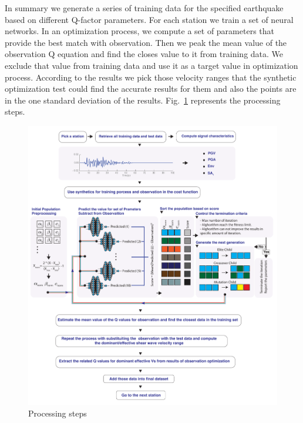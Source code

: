 
In summary we generate a series of training data for the specified earthquake based on different Q-factor parameters. For each station we train a set of neural networks. In an optimization process, we compute a set of parameters that provide the best match with observation. Then we peak the mean value of the observation Q equation and find the closes value to it from training data. We exclude that value from training data and use it as a target value in optimization process. According to the results we pick those velocity ranges that the synthetic optimization test could find the accurate results for them and also the points are in the one standard deviation of the results. Fig.~\ref{fig:Figure_1} represents the processing steps. 

 \begin{figure}
    \centering
    \includegraphics[width=\textwidth]{figures/pdf/Figure_1.pdf}
    \caption{Processing steps}
    \label{fig:Figure_1}
\end{figure}




